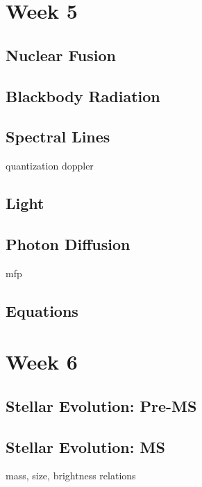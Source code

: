 \documentclass[a4paper,10pt]{article}
\begin{document}

\newpage
\section{Week 5}

\subsection{Nuclear Fusion}

\subsection{Blackbody Radiation}

\subsection{Spectral Lines}
quantization
doppler

\subsection{Light}

\subsection{Photon Diffusion}
mfp

\subsection{Equations}



\newpage
\section{Week 6}

\subsection{Stellar Evolution: Pre-MS}

\subsection{Stellar Evolution: MS}
mass, size, brightness relations
\end{document}
